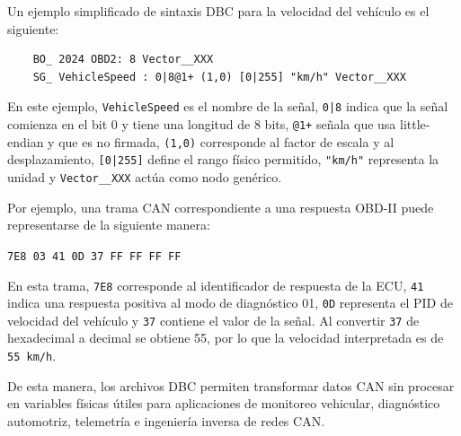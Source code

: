 Un ejemplo simplificado de sintaxis DBC para la velocidad del vehículo es el siguiente:\\

\begin{verbatim}
	BO_ 2024 OBD2: 8 Vector__XXX
	SG_ VehicleSpeed : 0|8@1+ (1,0) [0|255] "km/h" Vector__XXX
\end{verbatim}

En este ejemplo, \texttt{VehicleSpeed} es el nombre de la señal, \texttt{0|8} indica que la señal comienza en el bit 0 y tiene una longitud de 8 bits, \texttt{@1+} señala que usa little-endian y que es no firmada, \texttt{(1,0)} corresponde al factor de escala y al desplazamiento, \texttt{[0|255]} define el rango físico permitido, \texttt{"km/h"} representa la unidad y \texttt{Vector\_\_XXX} actúa como nodo genérico.

Por ejemplo, una trama CAN correspondiente a una respuesta OBD-II puede representarse de la siguiente manera:

\begin{center}
	\texttt{7E8 03 41 0D 37 FF FF FF FF}
\end{center}

En esta trama, \texttt{7E8} corresponde al identificador de respuesta de la ECU, \texttt{41} indica una respuesta positiva al modo de diagnóstico 01, \texttt{0D} representa el PID de velocidad del vehículo y \texttt{37} contiene el valor de la señal. Al convertir \texttt{37} de hexadecimal a decimal se obtiene 55, por lo que la velocidad interpretada es de \texttt{55 km/h}.

De esta manera, los archivos DBC permiten transformar datos CAN sin procesar en variables físicas útiles para aplicaciones de monitoreo vehicular, diagnóstico automotriz, telemetría e ingeniería inversa de redes CAN.


